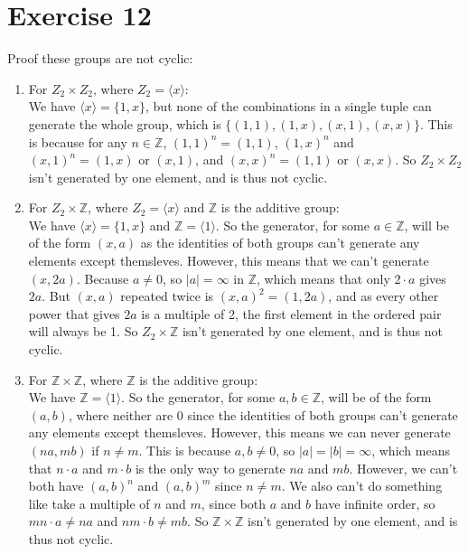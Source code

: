 \documentclass[12pt]{article}
\newcommand{\Z}{\mathbb{Z}}
\begin{document}
    \section*{Exercise 12}
    Proof these groups are not cyclic: 
    \begin{enumerate}[label=\textbf{\alph*.}]
        \item 
            For $Z_2 \times Z_2$,
            where $Z_2 = \langle x \rangle$: \\
            We have $\langle x \rangle = \{1, x\}$,
            but none of the combinations in a single tuple
            can generate the whole group,
            which is $\{(1, 1), (1, x), (x, 1), (x, x)\}$.
            This is because for any $n \in \Z$,
            $(1, 1)^n = (1, 1)$,
            $(1, x)^n$ and $(x, 1)^n = (1, x)$ or $(x, 1)$,
            and $(x, x)^n = (1, 1)$ or $(x, x)$.
            So $Z_2 \times Z_2$ isn't generated by one element,
            and is thus not cyclic.
        \item
            For $Z_2 \times \Z$,
            where $Z_2 = \langle x \rangle$
            and $\Z$ is the additive group: \\
            We have $\langle x \rangle = \{1, x\}$
            and $\Z = \langle 1 \rangle$.
            So the generator, for some $a \in \Z$,
            will be of the form $(x, a)$
            as the identities of both groups can't generate
            any elements except themsleves.
            However, this means that we can't generate $(x, 2a)$.
            Because $a \neq 0$, so $|a| = \infty$ in $\Z$,
            which means that only $2 \cdot a$ gives $2a$.
            But $(x, a)$ repeated twice is $(x, a)^2 = (1, 2a)$,
            and as every other power that gives $2a$ is a multiple of 2,
            the first element in the ordered pair will always be 1. 
            So $Z_2 \times \Z$ isn't generated by one element,
            and is thus not cyclic.
        \item
            For $\Z \times \Z$,
            where $\Z$ is the additive group: \\
            We have $\Z = \langle 1 \rangle$.
            So the generator, for some $a, b \in \Z$,
            will be of the form $(a, b)$,
            where neither are 0 
            since the identities of both groups can't generate any elements
            except themsleves.
            However, this means we can never generate $(na, mb)$
            if $n \neq m$.
            This is because $a, b \neq 0$,
            so $|a| = |b| = \infty$,
            which means that $n \cdot a$ and $m \cdot b$ is the only
            way to generate $na$ and $mb$.
            However, we can't both have $(a, b)^n$ and $(a, b)^m$
            since $n \neq m$.
            We also can't do something like take a multiple of $n$ and $m$,
            since both $a$ and $b$ have infinite order,
            so $mn \cdot a \neq na$ and $nm \cdot b \neq mb$.
            So $\Z \times \Z$ isn't generated by one element,
            and is thus not cyclic.
    \end{enumerate}
\end{document}
